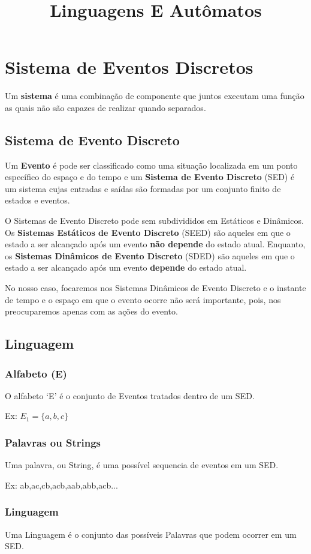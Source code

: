 \documentclass{article}
\title{Linguagens E Autômatos}
\begin{document}
\maketitle
\section{Sistema de Eventos Discretos}
Um \textbf{sistema} é uma combinação de componente que juntos executam uma função as quais não são capazes de realizar quando separados.
\subsection{Sistema de Evento Discreto}
Um \textbf{Evento} é pode ser classificado como uma situação localizada em um ponto específico do espaço e do tempo e um \textbf{Sistema de Evento Discreto} (SED) é um sistema cujas entradas e saídas são formadas por um conjunto finito de estados e eventos.

O Sistemas de Evento Discreto pode sem subdivididos em Estáticos e Dinâmicos. Os \textbf{Sistemas Estáticos de Evento Discreto} (SEED) são aqueles em que o estado a ser alcançado após um evento \textbf{não depende} do estado atual. Enquanto, os \textbf{Sistemas Dinâmicos de Evento Discreto} (SDED) são aqueles em que o estado a ser alcançado após um evento \textbf{depende} do estado atual.

No nosso caso, focaremos nos Sistemas Dinâmicos de Evento Discreto e o instante de tempo e o espaço em que o evento ocorre não será importante, pois, nos preocuparemos apenas com as ações do evento.
\subsection{Linguagem}
\subsubsection{Alfabeto (E)}
O alfabeto `E' é o conjunto de Eventos tratados dentro de um SED.

Ex: $E_1=\{a,b,c\}$
\subsubsection{Palavras ou Strings}
Uma palavra, ou String, é uma possível sequencia de eventos em um SED.

Ex: ab,ac,cb,acb,aab,abb,acb...
\subsubsection{Linguagem}
Uma Linguagem é o conjunto das possíveis Palavras que podem ocorrer em um SED.
\end{document}

